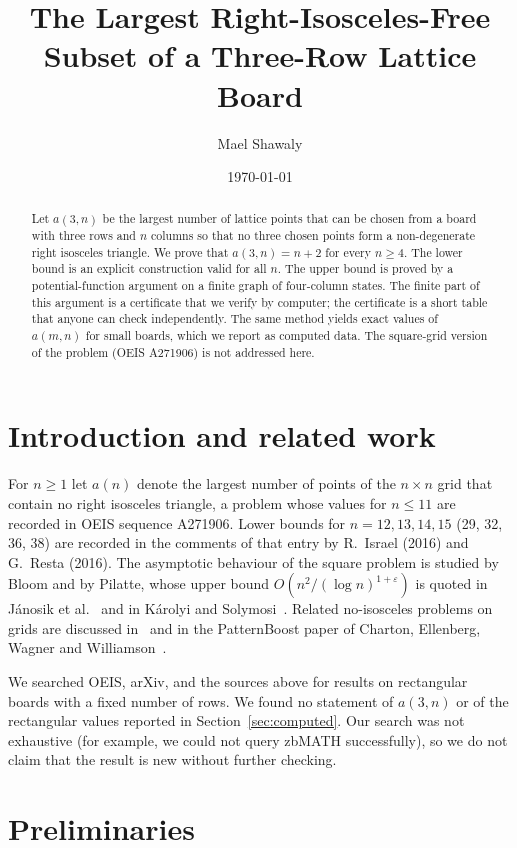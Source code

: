 \documentclass[11pt]{article}
\title{The Largest Right-Isosceles-Free Subset of a Three-Row Lattice Board}
\author{Mael Shawaly}
\date{\today}
\theoremstyle{definition}
\theoremstyle{remark}
\begin{document}
\maketitle

\begin{abstract}
Let $a(3,n)$ be the largest number of lattice points that can be chosen from a board with three rows and $n$ columns so that no three chosen points form a non-degenerate right isosceles triangle. We prove that $a(3,n)=n+2$ for every $n\ge 4$. The lower bound is an explicit construction valid for all $n$. The upper bound is proved by a potential-function argument on a finite graph of four-column states. The finite part of this argument is a certificate that we verify by computer; the certificate is a short table that anyone can check independently. The same method yields exact values of $a(m,n)$ for small boards, which we report as computed data. The square-grid version of the problem (OEIS A271906) is not addressed here.
\end{abstract}

\section{Introduction and related work}

For $n\ge 1$ let $a(n)$ denote the largest number of points of the $n\times n$ grid that contain no right isosceles triangle, a problem whose values for $n\le 11$ are recorded in OEIS sequence A271906. Lower bounds for $n=12,13,14,15$ (29, 32, 36, 38) are recorded in the comments of that entry by R.~Israel (2016) and G.~Resta (2016). The asymptotic behaviour of the square problem is studied by Bloom and by Pilatte, whose upper bound $O(n^2/(\log n)^{1+\varepsilon})$ is quoted in Jánosik et al.~\cite{janosik} and in Károlyi and Solymosi~\cite{karolyi}. Related no-isosceles problems on grids are discussed in~\cite{janosik} and in the PatternBoost paper of Charton, Ellenberg, Wagner and Williamson~\cite{patternboost}.

We searched OEIS, arXiv, and the sources above for results on rectangular boards with a fixed number of rows. We found no statement of $a(3,n)$ or of the rectangular values reported in Section~\ref{sec:computed}. Our search was not exhaustive (for example, we could not query zbMATH successfully), so we do not claim that the result is new without further checking.

\section{Preliminaries}
\end{document}
